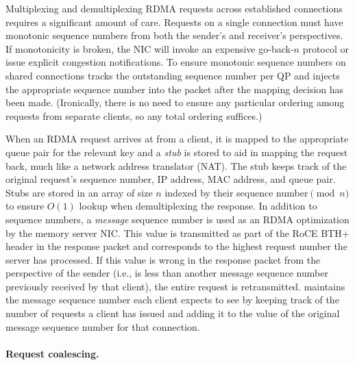Multiplexing and demultiplexing RDMA requests across established
connections requires a significant amount of care. Requests on a
single connection must have monotonic sequence numbers from both the
sender's and receiver's perspectives. If monotonicity is broken, the
NIC will invoke an expensive go-back-$n$ protocol or issue explicit
congestion notifications. To ensure monotonic sequence numbers on
shared connections {\sword} tracks the outstanding sequence number per QP and
injects the appropriate sequence number into the packet after the
mapping decision has been made.  (Ironically, there is no need to
ensure any particular ordering among requests from separate clients, so
any total ordering suffices.)

When an RDMA request arrives at {\sword} from a client, it is
mapped to the appropriate queue pair for the relevant key and a
\emph{stub} is stored to aid in mapping the request back, much like a
network address translator (NAT). The stub keeps track of the original
request's sequence number, IP address, MAC address, and queue
pair. Stubs are stored in an array of size $n$ indexed by their
sequence number$\pmod n$ to ensure $O(1)$ lookup when demultiplexing
the response.
In addition to sequence numbers, a \emph{message} sequence number
is used as an RDMA optimization by the memory server NIC. This value
is transmitted as part of the RoCE BTH+ header in the response packet
and corresponds to the highest request number the server has
processed. If this value is wrong in the response packet from the
perspective of the sender (i.e., is less than another message sequence
number previously received by that client), the entire request is
retransmitted.  {\sword} maintains the message sequence number each client
expects to see by keeping track of the number of requests a client has
issued and adding it to the value of the original message sequence
number for that connection.

\paragraph{Request coalescing.}

